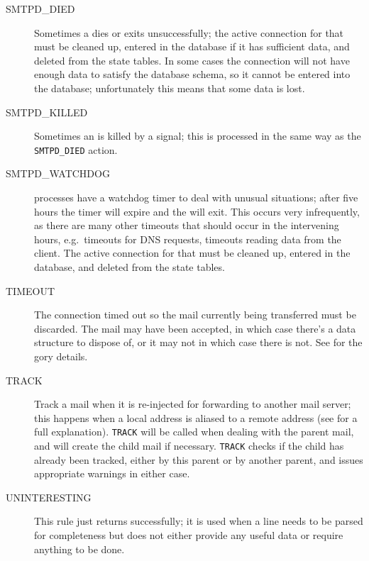 \begin{description}
    \item [SMTPD\_DIED] Sometimes a  dies or exits
        unsuccessfully; the active connection for that  must
        be cleaned up, entered in the database if it has sufficient data,
        and deleted from the state tables.  In some cases the connection
        will not have enough data to satisfy the database schema, so it
        cannot be entered into the database; unfortunately this means that
        some data is lost.

    \item [SMTPD\_KILLED] Sometimes an  is killed by a
        signal; this is processed in the same way as the
        \texttt{SMTPD\_DIED} action.

    \item [SMTPD\_WATCHDOG]  processes have a watchdog timer
        to deal with unusual situations; after five hours the timer will
        expire and the  will exit.  This occurs very
        infrequently, as there are many other timeouts that should occur in
        the intervening hours, e.g.\ timeouts for DNS requests, timeouts
        reading data from the client.  The active connection for that
         must be cleaned up, entered in the database, and
        deleted from the state tables.

    \item [TIMEOUT] The connection timed out so the mail currently being
        transferred must be discarded.  The mail may have been accepted, in
        which case there's a data structure to dispose of, or it may not in
        which case there is not.  See  for the gory details.

    \item [TRACK] Track a mail when it is re-injected for forwarding to
        another mail server; this happens when a local address is aliased
        to a remote address (see  for
        a full explanation).  \texttt{TRACK} will be called when dealing
        with the parent mail, and will create the child mail if necessary.
        \texttt{TRACK} checks if the child has already been tracked, either
        by this parent or by another parent, and issues appropriate
        warnings in either case.

    \item [UNINTERESTING] This rule just returns successfully; it is used
        when a line needs to be parsed for completeness but does not either
        provide any useful data or require anything to be done.

\end{description}

